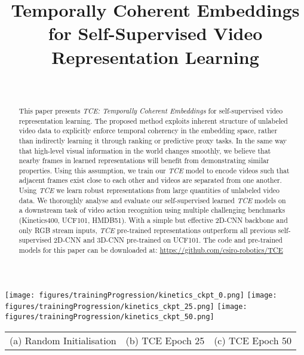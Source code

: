 \documentclass[a4paper,conference]{IEEEtran}
\begin{document}
\title{\LARGE \bf{Temporally Coherent Embeddings for Self-Supervised Video Representation Learning}}


\author{ \\
}



\maketitle

\begin{strip}\centering
\texttt{[image: figures/trainingProgression/kinetics\_ckpt\_0.png]}
\texttt{[image: figures/trainingProgression/kinetics\_ckpt\_25.png]}
\texttt{[image: figures/trainingProgression/kinetics\_ckpt\_50.png]} \\
\begin{tabular}{>{\centering}p{}>{\centering}p{}>{\centering}p{}}
(a) Random Initialisation & (b) TCE Epoch 25 & (c) TCE Epoch 50
\end{tabular}
\end{strip}

\begin{abstract}
\label{sec:abstract}
This paper presents \textit{TCE: Temporally Coherent Embeddings} for self-supervised video representation learning. The proposed method exploits inherent structure of unlabeled video data to explicitly enforce temporal coherency in the embedding space, rather than indirectly learning it through ranking or predictive proxy tasks. In the same way that high-level visual information in the world changes smoothly, we believe that nearby frames in learned representations will benefit from demonstrating similar properties. Using this assumption, we train our \textit{TCE} model to encode videos such that adjacent frames exist close to each other and videos are separated from one another. Using \textit{TCE} we learn robust representations from large quantities of unlabeled video data. We thoroughly analyse and evaluate our self-supervised learned \textit{TCE} models on a downstream task of video action recognition using multiple challenging benchmarks (Kinetics400, UCF101, HMDB51). With a simple but effective 2D-CNN backbone and only RGB stream inputs, \textit{TCE} pre-trained representations outperform all previous self-supervised 2D-CNN and 3D-CNN pre-trained on UCF101. The code and pre-trained models for this paper can be downloaded at: \href{https://github.com/csiro-robotics/tce.git}{https://github.com/csiro-robotics/TCE}






\end{abstract}
 
\end{document}
